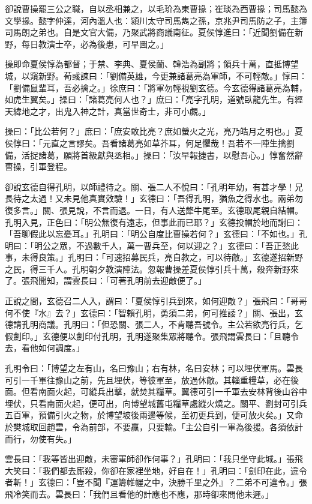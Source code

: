 卻說曹操罷三公之職，自以丞相兼之，以毛玠為東曹掾；崔琰為西曹掾；司馬懿為文學掾。懿字仲達，河內溫人也：潁川太守司馬雋之孫，京兆尹司馬防之子，主簿司馬朗之弟也。自是文官大備，乃聚武將商議南征。夏侯惇進曰：「近聞劉備在新野，每日教演士卒，必為後患，可早圖之。」

操即命夏侯惇為都督；于禁、李典、夏侯蘭、韓浩為副將；領兵十萬，直抵博望城，以窺新野。荀彧諫曰：「劉備英雄，今更兼諸葛亮為軍師，不可輕敵。」惇曰：「劉備鼠輩耳，吾必擒之。」徐庶曰：「將軍勿輕視劉玄德。今玄德得諸葛亮為輔，如虎生翼矣。」操曰：「諸葛亮何人也？」庶曰：「亮字孔明，道號臥龍先生。有經天緯地之才，出鬼入神之計，真當世奇士，非可小覷。」

操曰：「比公若何？」庶曰：「庶安敢比亮？庶如螢火之光，亮乃皓月之明也。」夏侯惇曰：「元直之言謬矣。吾看諸葛亮如草芥耳，何足懼哉！吾若不一陣生擒劉備，活捉諸葛，願將首級獻與丞相。」操曰：「汝早報捷書，以慰吾心。」惇奮然辭曹操，引軍登程。

卻說玄德自得孔明，以師禮待之。關、張二人不悅曰：「孔明年幼，有甚才學！兄長待之太過！又未見他真實效驗！」玄德曰：「吾得孔明，猶魚之得水也。兩弟勿復多言。」關、張見說，不言而退。一日，有人送犛牛尾至。玄德取尾親自結帽。孔明入見，正色曰：「明公無復有遠志，但事此而已耶？」玄德投帽於地而謝曰：「吾聊假此以忘憂耳。」孔明曰：「明公自度比曹操若何？」玄德曰：「不如也。」孔明曰：「明公之眾，不過數千人，萬一曹兵至，何以迎之？」玄德曰：「吾正愁此事，未得良策。」孔明曰：「可速招募民兵，亮自教之，可以待敵。」玄德遂招新野之民，得三千人。孔明朝夕教演陣法。忽報曹操差夏侯惇引兵十萬，殺奔新野來了。張飛聞知，謂雲長曰：「可著孔明前去迎敵便了。」

正說之間，玄德召二人入，謂曰：「夏侯惇引兵到來，如何迎敵？」張飛曰：「哥哥何不使『水』去？」玄德曰：「智賴孔明，勇須二弟，何可推諉？」關、張出，玄德請孔明商議。孔明曰：「但恐關、張二人，不肯聽吾號令。主公若欲亮行兵，乞假劍印。」玄德便以劍印付孔明，孔明遂聚集眾將聽令。張飛謂雲長曰：「且聽令去，看他如何調度。」

孔明令曰：「博望之左有山，名曰豫山；右有林，名曰安林；可以埋伏軍馬。雲長可引一千軍往豫山之前，先且埋伏，等彼軍至，放過休敵。其輜重糧草，必在後面。但看南面火起，可縱兵出擊，就焚其糧草。翼德可引一千軍去安林背後山谷中埋伏，只看南面火起，便可出，向博望城舊屯糧草處縱火燒之。關平、劉封可引兵五百軍，預備引火之物，於博望坡後兩邊等候，至初更兵到，便可放火矣。」又命於樊城取回趙雲，令為前部，不要贏，只要輸。「主公自引一軍為後援。各須依計而行，勿使有失。」

雲長曰：「我等皆出迎敵，未審軍師卻作何事？」孔明曰：「我只坐守此城。」張飛大笑曰：「我們都去廝殺，你卻在家裡坐地，好自在！」孔明曰：「劍印在此，違令者斬！」玄德曰：「豈不聞『運籌帷幄之中，決勝千里之外』？二弟不可違令。」張飛冷笑而去。雲長曰：「我們且看他的計應也不應，那時卻來問他未遲。」

